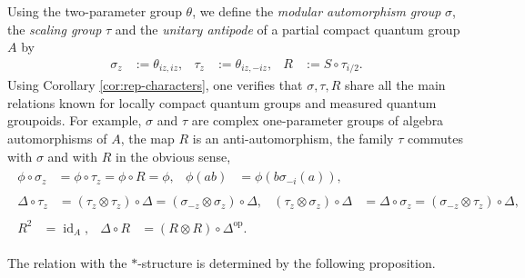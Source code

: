 \documentclass[10pt]{article}
\DeclareMathOperator{\id}{id}
\DeclareMathOperator{\op}{\mathrm{op}}
\theoremstyle{definition}
\numberwithin{equation}{section}
\begin{document}
Using the two-parameter group $\theta$, we define the \emph{modular
  automorphism group} $\sigma$, the \emph{scaling group} $\tau$   and
the \emph{unitary antipode} of a partial compact quantum group $A$ by
\begin{align} \label{eq:rep-groups}
  \sigma_{z} &:=\theta_{iz,iz}, & \tau_{z} &:=\theta_{iz,-iz}, & R&:=S
  \circ \tau_{i/2}.
\end{align}
Using Corollary \ref{cor:rep-characters}, one verifies that
$\sigma,\tau,R$ share all the main relations known for locally compact
quantum groups and measured quantum groupoids. For example, $\sigma$
and $\tau$ are complex one-parameter groups of algebra automorphisms
of $A$, the map $R$ is an anti-automorphism, the family  $\tau$ commutes with
$\sigma$ and with $R$ in the obvious sense, 
  \begin{gather}
    \begin{aligned} \label{eq:modular}
      \phi\circ \sigma_{z} &= \phi \circ \tau_{z} = \phi \circ R =
      \phi, & \phi(ab) &= \phi(b\sigma_{-i}(a)),
    \end{aligned}
\\ \label{eq:scaling-modular-delta}
    \begin{aligned} 
    \Delta \circ \tau_{z} &= (\tau_{z} \otimes \tau_{z}) \circ \Delta = (\sigma_{-z}\otimes \sigma_{z})\circ\Delta,
    & (\tau_{z} \otimes \sigma_{z}) \circ \Delta &= \Delta \circ
    \sigma_{z} = (\sigma_{-z} \otimes \tau_{z}) \circ \Delta,      
  \end{aligned} \\
  \begin{aligned} \label{eq:unitary-antipode}
    R^{2} &= \id_{A}, & \Delta \circ R &= (R \otimes R) \circ
    \Delta^{\op}.
  \end{aligned}
  \end{gather}

The relation with the $*$-structure is determined by the following proposition.
\end{document}
